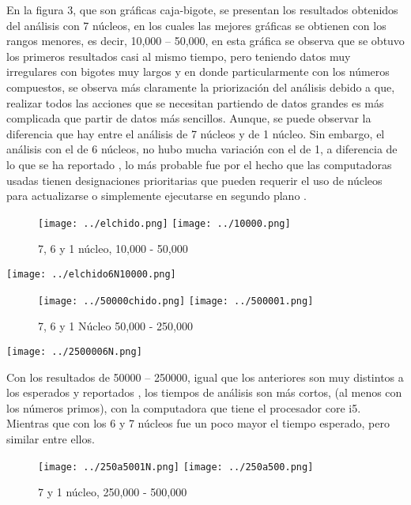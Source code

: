 \documentclass{article}
\begin{document}
En la figura 3, que son gráficas caja-bigote, se presentan los resultados obtenidos del análisis con 7 núcleos, en los cuales las mejores gráficas se obtienen con los rangos menores, es decir, 10,000 – 50,000, en esta gráfica se observa que se obtuvo los primeros resultados casi al mismo tiempo, pero teniendo datos muy irregulares con bigotes muy largos y en donde particularmente con los números compuestos, se observa más claramente la priorización del análisis debido a que, realizar todos las acciones que se necesitan partiendo de datos grandes es más complicada que partir de datos más sencillos. Aunque, se puede observar la diferencia que hay entre el análisis de 7 núcleos y de 1 núcleo. Sin embargo, el análisis con el de 6 núcleos, no hubo mucha variación con el de 1, a diferencia de lo que se ha reportado \cite{REF4}, lo más probable fue por el hecho que las computadoras usadas tienen designaciones prioritarias que pueden requerir el uso de núcleos para actualizarse o simplemente ejecutarse en segundo plano \cite{REF5}.

\begin{figure}[hbtp]
\texttt{[image: ../elchido.png]}  \texttt{[image: ../10000.png]} 
\caption{7, 6 y 1 núcleo, 10,000 - 50,000}
\end{figure}

\texttt{[image: ../elchido6N10000.png]} \centering
                                               
\begin{figure}[hbtp]                                  
\texttt{[image: ../50000chido.png]}   \texttt{[image: ../500001.png]} 
\caption{ 7, 6 y 1 Núcleo 50,000 - 250,000}
\end{figure}                                               
\texttt{[image: ../2500006N.png]}   \centering   

Con los resultados de 50000 – 250000, igual que los anteriores son muy distintos a los esperados y reportados \cite{REF4}, los tiempos de análisis son más cortos, (al menos con los números primos), con la computadora que tiene el procesador core i5. Mientras que con los 6 y 7 núcleos fue un poco mayor el tiempo esperado, pero similar entre ellos.

\begin{figure}[hbtp]                            \texttt{[image: ../250a5001N.png]} 
\texttt{[image: ../250a500.png]}   
\caption{ 7 y 1 núcleo, 250,000 - 500,000}
\end{figure}
\end{document}
